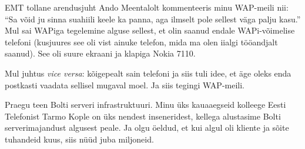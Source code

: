 EMT tollane arendusjuht Ando Meentalolt kommenteeris minu WAP-meili nii: \enquote{Sa võid ju sinna suahiili keele ka panna, aga 
ilmselt pole sellest väga palju kasu.} Mul sai WAPiga tegelemine 
alguse sellest, et olin saanud endale WAPi-võimelise telefoni (kusjuures see oli vist ainuke telefon, mida ma olen iialgi tööandjalt saanud). See oli suure ekraani ja klapiga
Nokia 7110. 


Mul juhtus \emph{vice versa}: kõigepealt sain telefoni ja siis 
tuli idee, et äge oleks enda postkasti vaadata sellisel mugaval moel. Ja siis tegingi 
WAP-meili.


Praegu teen Bolti serveri infrastruktuuri. Minu üks kauaaegseid 
kolleege Eesti Telefonist Tarmo Kople on 
üks nendest inseneridest, kellega alustasime Bolti 
serverimajandust algusest peale. Ja olgu öeldud, et kui algul oli kliente ja sõite tuhandeid kuus, siis nüüd juba miljoneid.
